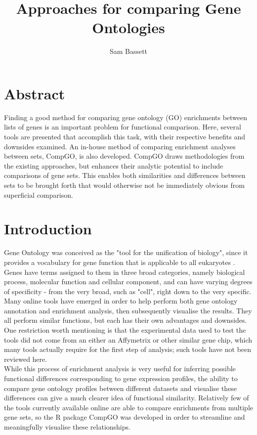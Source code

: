 \documentclass[11pt, oneside]{article}
\title{Approaches for comparing Gene Ontologies}
\author{Sam Bassett}
\affil{Developmental and Stem Cell Biology Lab,\\Victor Chang Cardiac Research Institute,\\Darlinghurst, Sydney, Australia}
\date{}
\begin{document}
\maketitle
\section*{Abstract}
Finding a good method for comparing gene ontology (GO) enrichments between lists of genes is an important problem for functional comparison. Here, several tools are presented that accomplish this task, with their respective benefits and downsides examined. An in-house method of comparing enrichment analyses between sets, CompGO, is also developed. CompGO draws methodologies from the existing approaches, but enhances their analytic potential to include comparisons of gene sets. This enables both similarities and differences between sets to be brought forth that would otherwise not be immediately obvious from superficial comparison.

\section*{Introduction}
Gene Ontology was conceived as the "tool for the unification of biology", since it provides a vocabulary for gene function that is applicable to all eukaryotes \cite{GOConsort00}. Genes have terms assigned to them in three broad categories, namely biological process, molecular function and cellular component, and can have varying degrees of specificity - from the very broad, such as "cell", right down to the very specific.\\
Many online tools have emerged in order to help perform both gene ontology annotation and enrichment analysis, then subsequently visualise the results. They all perform similar functions, but each has their own advantages and downsides. One restriction worth mentioning is that the experimental data used to test the tools did not come from an either an Affymetrix or other similar gene chip, which many tools actually require for the first step of analysis; such tools have not been reviewed here.\\
While this process of enrichment analysis is very useful for inferring possible functional differences corresponding to gene expression profiles, the ability to compare gene ontology profiles between different datasets and visualise these differences can give a much clearer idea of functional similarity. Relatively few of the tools currently available online are able to compare enrichments from multiple gene sets, so the R package CompGO was developed in order to streamline and meaningfully visualise these relationships. 
\end{document}
